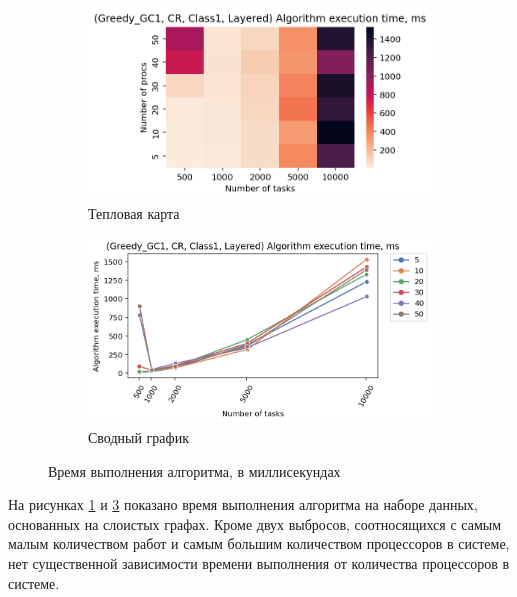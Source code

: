 \begin{figure}[!htbp]
    \centering
    \begin{subfigure}{0.49\textwidth}
        \includegraphics[width=\textwidth]{imgs/layered_class_1/CR/et_heatmap.png}
        \caption{Тепловая карта}
        \label{fig:CR-layered-exec-time-heatmap}
    \end{subfigure}
    \hfill
    \begin{subfigure}{0.49\textwidth}
        \includegraphics[width=\textwidth]{imgs/layered_class_1/CR/tr_graph.png}
        \caption{Сводный график}
        \label{fig:CR-layered-exec-time-compiled}
    \end{subfigure}
    \caption{Время выполнения алгоритма, в миллисекундах}
\end{figure}

На рисунках \ref{fig:CR-layered-exec-time-heatmap} и \ref{fig:CR-layered-exec-time-compiled} показано время выполнения алгоритма на наборе данных, основанных на слоистых графах. Кроме двух выбросов, соотносящихся с самым малым количеством работ и самым большим количеством процессоров в системе, нет существенной зависимости времени выполнения от количества процессоров в системе.

